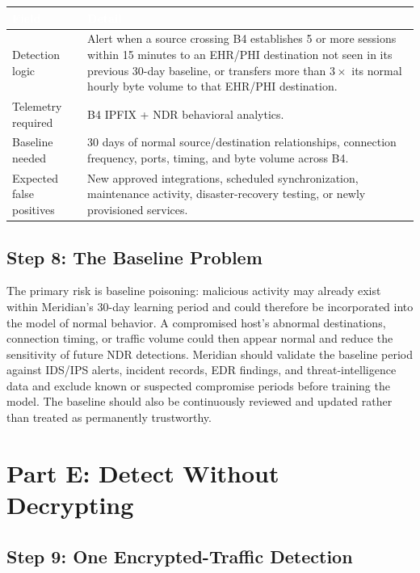 \documentclass[11pt,letterpaper]{article}
\renewcommand{\arraystretch}{1.22}
\newcommand{\labtablesetup}{%
  \footnotesize
  \setlength{\tabcolsep}{4pt}%
  \renewcommand{\arraystretch}{1.28}%
}
\newcommand{\labstep}[1]{%
  \Needspace{8\baselineskip}%
  \subsection*{#1}%
  \nopagebreak
}
\newcommand{\labpartbig}[1]{%
  \par\vspace{0.15em}%
  \Needspace{22\baselineskip}%
  \section*{#1}%
  \nopagebreak
}
\begin{document}
\begingroup\labtablesetup
\begin{tabularx}{\textwidth}{@{}L{3.6cm}Y@{}}
\toprule
{}
\textcolor{white}{\textbf{Field}} &
\textcolor{white}{\textbf{Detail}} \\
\midrule
Detection logic &
Alert when a source crossing B4 establishes 5 or more sessions within 15 minutes to an EHR/PHI destination not seen in its previous 30-day baseline, or transfers more than $3\times$ its normal hourly byte volume to that EHR/PHI destination. \\
Telemetry required &
B4 IPFIX + NDR behavioral analytics. \\
Baseline needed &
30 days of normal source/destination relationships, connection frequency, ports, timing, and byte volume across B4. \\
Expected false positives &
New approved integrations, scheduled synchronization, maintenance activity, disaster-recovery testing, or newly provisioned services. \\
\bottomrule
\end{tabularx}
\endgroup

\labstep{Step 8: The Baseline Problem}

The primary risk is baseline poisoning: malicious activity may already exist within Meridian's 30-day learning period and could therefore be incorporated into the model of normal behavior. A compromised host's abnormal destinations, connection timing, or traffic volume could then appear normal and reduce the sensitivity of future NDR detections. Meridian should validate the baseline period against IDS/IPS alerts, incident records, EDR findings, and threat-intelligence data and exclude known or suspected compromise periods before training the model. The baseline should also be continuously reviewed and updated rather than treated as permanently trustworthy.

\labpartbig{Part E: Detect Without Decrypting}

\labstep{Step 9: One Encrypted-Traffic Detection}
\end{document}
